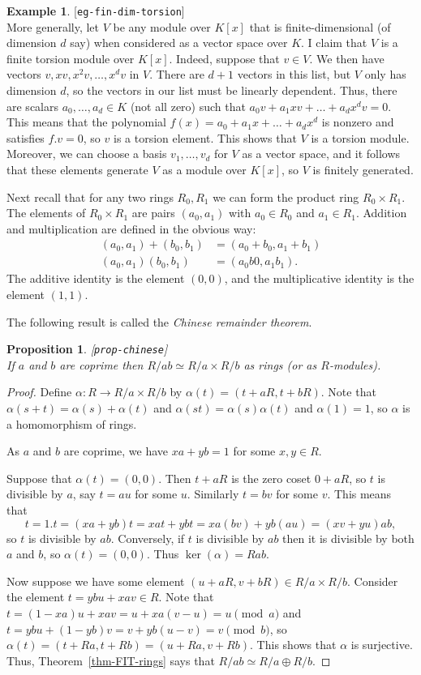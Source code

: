 \documentclass{amsart}
\newcommand{\lbl}[1]{\label{#1}\textup{[\texttt{#1}]}\ \\}
\newcommand{\lbl}{\label}
\newcommand{\al}        {\alpha}
\newcommand{\tm}        {\times}
\newcommand{\xra}       {\xrightarrow}
\newcommand{\op}        {\oplus}
\renewcommand{\:}{\colon}
\newtheorem{proposition}[theorem]{Proposition}
\theoremstyle{definition}
\newtheorem{example}[theorem]{Example}
\begin{document}
\begin{example}\lbl{eg-fin-dim-torsion}
 More generally, let $V$ be any module over $K[x]$ that is
 finite-dimensional (of dimension $d$ say) when considered as a vector
 space over $K$.  I claim that $V$ is a finite torsion module over
 $K[x]$.  Indeed, suppose that $v\in V$.  We then have vectors
 $v,xv,x^2v,\ldots,x^dv$ in $V$.  There are $d+1$ vectors in this
 list, but $V$ only has dimension $d$, so the vectors in our list must
 be linearly dependent.  Thus, there are scalars $a_0,\ldots,a_d\in K$
 (not all zero) such that $a_0v+a_1xv+\ldots+a_dx^dv=0$.  This means
 that the polynomial $f(x)=a_0+a_1x+\ldots+a_dx^d$ is nonzero and
 satisfies $f.v=0$, so $v$ is a torsion element.  This shows that $V$
 is a torsion module.  Moreover, we can choose a basis
 $v_1,\ldots,v_d$ for $V$ as a vector space, and it follows that these
 elements generate $V$ as a module over $K[x]$, so $V$ is finitely
 generated. 
\end{example}


Next recall that for any two rings $R_0,R_1$ we can form the product
ring $R_0\tm R_1$.  The elements of $R_0\tm R_1$ are pairs $(a_0,a_1)$
with $a_0\in R_0$ and $a_1\in R_1$.  Addition and multiplication are
defined in the obvious way:
\begin{align*}
 (a_0,a_1)+(b_0,b_1) &= (a_0+b_0,a_1+b_1) \\
 (a_0,a_1)(b_0,b_1)  &= (a_0b0,a_1b_1).
\end{align*}
The additive identity is the element $(0,0)$, and the multiplicative
identity is the element $(1,1)$.

The following result is called the \emph{Chinese remainder theorem}.
\begin{proposition}\lbl{prop-chinese}
 If $a$ and $b$ are coprime then $R/ab\simeq R/a\tm R/b$ as rings (or
 as $R$-modules).
\end{proposition}
\begin{proof}
 Define $\al\:R\xra{}R/a\tm R/b$ by $\al(t)=(t+aR,t+bR)$.  Note that
 $\al(s+t)=\al(s)+\al(t)$ and $\al(st)=\al(s)\al(t)$ and $\al(1)=1$,
 so $\al$ is a homomorphism of rings.

 As $a$ and $b$ are coprime, we have $xa+yb=1$ for some $x,y\in R$.  

 Suppose that $\al(t)=(0,0)$.  Then $t+aR$ is the zero coset $0+aR$,
 so $t$ is divisible by $a$, say $t=au$ for some $u$.  Similarly
 $t=bv$ for some $v$.  This means that 
 \[ t = 1.t = (xa+yb)t=xat+ybt=xa(bv)+yb(au)=(xv+yu)ab, \]
 so $t$ is divisible by $ab$.  Conversely, if $t$ is divisible by $ab$
 then it is divisible by both $a$ and $b$, so $\al(t)=(0,0)$.  Thus
 $\ker(\al)=Rab$.

 Now suppose we have some element $(u+aR,v+bR)\in R/a\tm R/b$.
 Consider the element $t=ybu+xav\in R$.  Note that
 $t=(1-xa)u+xav=u+xa(v-u)=u\pmod{a}$ and
 $t=ybu+(1-yb)v=v+yb(u-v)=v\pmod{b}$, so
 $\al(t)=(t+Ra,t+Rb)=(u+Ra,v+Rb)$.  This shows that $\al$ is
 surjective.  Thus, Theorem~\ref{thm-FIT-rings} says that
 $R/ab\simeq R/a\op R/b$.
\end{proof}
\end{document}

